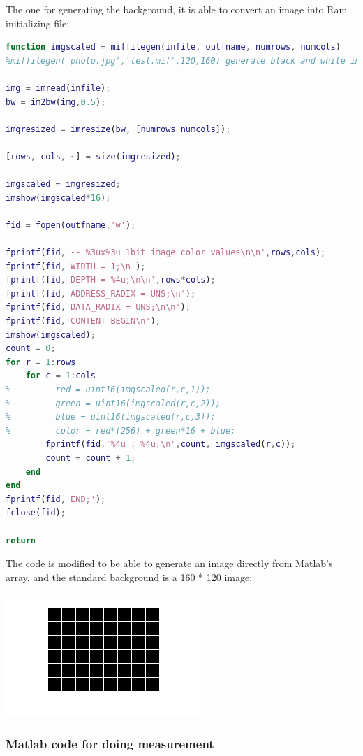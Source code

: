 \documentclass[11pt]{scrartcl}
\begin{document}
The one for generating the background, it is able to convert an image into Ram initializing file:
\begin{lstlisting}[language=Matlab]
function imgscaled = miffilegen(infile, outfname, numrows, numcols)
%miffilegen('photo.jpg','test.mif',120,160) generate black and white image.

img = imread(infile);
bw = im2bw(img,0.5);

imgresized = imresize(bw, [numrows numcols]);

[rows, cols, ~] = size(imgresized);

imgscaled = imgresized;
imshow(imgscaled*16);

fid = fopen(outfname,'w');

fprintf(fid,'-- %3ux%3u 1bit image color values\n\n',rows,cols);
fprintf(fid,'WIDTH = 1;\n');
fprintf(fid,'DEPTH = %4u;\n\n',rows*cols);
fprintf(fid,'ADDRESS_RADIX = UNS;\n');
fprintf(fid,'DATA_RADIX = UNS;\n\n');
fprintf(fid,'CONTENT BEGIN\n');
imshow(imgscaled);
count = 0;
for r = 1:rows
    for c = 1:cols
%         red = uint16(imgscaled(r,c,1));
%         green = uint16(imgscaled(r,c,2));
%         blue = uint16(imgscaled(r,c,3));
%         color = red*(256) + green*16 + blue;
        fprintf(fid,'%4u : %4u;\n',count, imgscaled(r,c));
        count = count + 1;
    end
end
fprintf(fid,'END;');
fclose(fid);

return
\end{lstlisting}

The code is modified to be able to generate an image directly from Matlab's array, and the standard background is a 160 * 120 image:
\begin{center}
\begin{minipage}[t]{\linewidth}

{
\includegraphics[scale = 1]{temp.png}
}
\end{minipage}
\medskip
\end{center}

\subsubsection{Matlab code for doing measurement}
\end{document}
